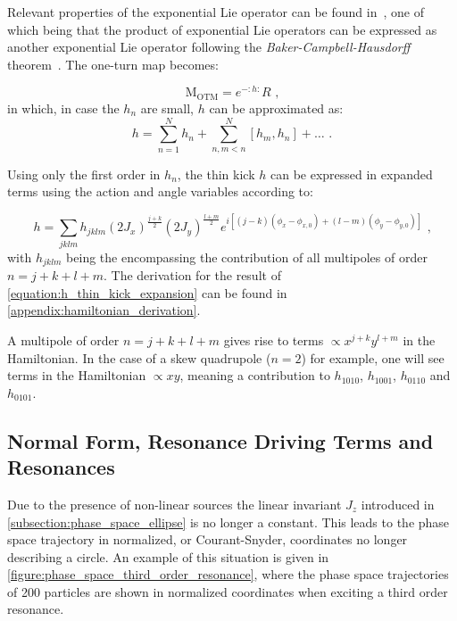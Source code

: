 Relevant properties of the exponential Lie operator can be found in~\cite{PHD:Tomas, PHD:Franchi}, one of which being that the product of exponential Lie operators can be expressed as another exponential Lie operator following the \emph{Baker-Campbell-Hausdorff} theorem~\cite{BOOK:Hall:Lie_Group_Algebra_Representations}.
The one-turn map becomes:

\begin{equation}
    \mathrm{M_{OTM}} = e^{-:h:} R \text{ ,}
    \label{equation:Campbell_Baker_Hausdorff_theorem}
\end{equation}
in which, in case the \(h_n\) are small, \(h\) can be approximated as:
\begin{equation}
    h = \sum_{n=1}^N h_n + \sum_{n, m<n}^N \left[ h_m, h_n \right] + \ldots \text{ .}
    \label{equation:h_thin_kick_approximation}
\end{equation}

Using only the first order in \(h_n\), the thin kick \(h\) can be expressed in expanded terms using the action and angle variables according to:

\begin{equation}
    h = \sum_{jklm} h_{jklm} \left( 2 J_x \right)^{\frac{j+k}{2}} \left( 2 J_y \right)^{\frac{l+m}{2}} e^{i \left[ \left(j-k\right) \left(\phi_x - \phi_{x,0} \right) + \left(l-m\right) \left(\phi_y - \phi_{y,0} \right) \right]} \text{ ,}
    \label{equation:h_thin_kick_expansion}
\end{equation}
with \(h_{jklm}\) being the  encompassing the contribution of all multipoles of order \(n = j + k + l + m\). 
The derivation for the result of \cref{equation:h_thin_kick_expansion} can be found in \cref{appendix:hamiltonian_derivation}.

A multipole of order \(n = j + k + l + m\) gives rise to terms \(\propto x^{j+k} y^{l+m}\) in the Hamiltonian.
In the case of a \gls{skew} quadrupole (\(n=2\)) for example, one will see terms in the Hamiltonian \(\propto xy\), meaning a contribution to \(h_{1010}\), \(h_{1001}\), \(h_{0110}\) and \(h_{0101}\).

\subsection{Normal Form, Resonance Driving Terms and Resonances}
\label{subsection:normal_form_and_rdt}

Due to the presence of non-linear sources the linear invariant \(J_z\) introduced in \cref{subsection:phase_space_ellipse} is no longer a constant.
This leads to the phase space trajectory in normalized, or Courant-Snyder, coordinates no longer describing a circle.
An example of this situation is given in \cref{figure:phase_space_third_order_resonance}, where the phase space trajectories of \num{200} particles are shown in normalized coordinates when exciting a third order resonance.

